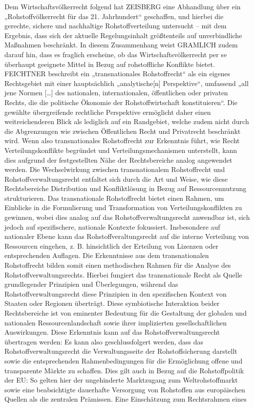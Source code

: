 \documentclass[12pt,a4paper,oneside]{book} %
\begin{document}
Dem Wirtschaftsvölkerrecht folgend hat ZEISBERG eine Abhandlung über ein „Rohstoffvölkerrecht für das 21. Jahrhundert“ geschaffen,\autocite{zeisberg_rohstoffvolkerrecht_2021} und hierbei die gerechte, sichere und nachhaltige Rohstoffverteilung untersucht – mit dem Ergebnis, dass sich der aktuelle Regelungsinhalt größtenteils auf unverbindliche Maßnahmen beschränkt. In diesem Zusammenhang weist GRAMLICH zudem darauf hin, dass es fraglich erscheine, ob das Wirtschaftsvölkerrecht per se überhaupt geeignete Mittel in Bezug auf rohstoffliche Konflikte bietet.\autocite{gramlich_zeisberg_2021} FEICHTNER beschreibt ein „transnationales Rohstoffrecht“ als ein eigenes Rechtsgebiet mit einer hauptsächlich „analytische[n] Perspektive“, umfassend „all jene Normen […] des nationalen, internationalen, öffentlichen oder privaten Rechts, die die politische Ökonomie der Rohstoffwirtschaft konstituieren“.\autocite{feichtner_besonderheit_2016} Die gewählte übergreifende rechtliche Perspektive ermöglicht daher einen weitreichenderen Blick als lediglich auf ein Randgebiet, welche zudem nicht durch die Abgrenzungen wie zwischen Öffentlichen Recht und Privatrecht beschränkt wird. Wenn also transnationales Rohstoffrecht zur Erkenntnis führt, wie Recht Verteilungskonflikte begründet und Verteilungsmechanismen unterstellt,\autocite{feichtner_besonderheit_2016} kann dies aufgrund der festgestellten Nähe der Rechtsbereiche analog angewendet werden. Die Wechselwirkung zwischen transnationalem Rohstoffrecht und Rohstoffverwaltungsrecht entfaltet sich durch die Art und Weise, wie diese Rechtsbereiche Distribution und Konfliktlösung in Bezug auf Ressourcennutzung strukturieren. Das transnationale Rohstoffrecht bietet einen Rahmen, um Einblicke in die Formulierung und Transformation von Verteilungskonflikten zu gewinnen, wobei dies analog auf das Rohstoffverwaltungsrecht anwendbar ist, sich jedoch auf spezifischere, nationale Kontexte fokussiert. Insbesondere auf nationaler Ebene kann das Rohstoffveraltungsrecht auf die interne Verteilung von Ressourcen eingehen, z. B. hinsichtlich der Erteilung von Lizenzen oder entsprechenden Auflagen. Die Erkenntnisse aus dem transnationalen Rohstoffrecht bilden somit einen methodischen Rahmen für die Analyse des Rohstoffverwaltungsrechts. Hierbei fungiert das transnationale Recht als Quelle grundlegender Prinzipien und Überlegungen, während das Rohstoffverwaltungsrecht diese Prinzipien in den spezifischen Kontext von Staaten oder Regionen überträgt. Diese symbiotische Interaktion beider Rechtsbereiche ist von eminenter Bedeutung für die Gestaltung der globalen und nationalen Ressourcenlandschaft sowie ihrer implizierten gesellschaftlichen Auswirkungen. Diese Erkenntnis kann auf das Rohstoffverwaltungsrecht übertragen werden: Es kann also geschlussfolgert werden, dass das Rohstoffverwaltungsrecht die Verwaltungsseite der Rohstoffsicherung darstellt sowie die entsprechenden Rahmenbedingungen für die Ermöglichung offene und transparente Märkte zu schaffen. Dies gilt auch in Bezug auf die Rohstoffpolitik der EU: So gelten hier der ungehinderte Marktzugang zum Weltrohstoffmarkt sowie eine beabsichtigte dauerhafte Versorgung von Rohstoffen aus europäischen Quellen als die zentralen Prämissen.\autocite[4]{dauke_rohstoff-_2011} Eine Einschätzung zum Rechtsrahmen eines 
\end{document}
